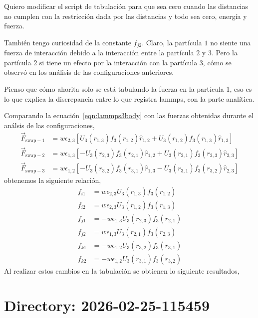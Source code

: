 \documentclass[../main.tex]{subfiles}
\begin{document}
Quiero modificar el script de tabulación para que sea cero cuando las distancias no cumplen con la restricción dada por las distancias y todo sea cero, energía y fuerza.

También tengo curiosidad de la constante $f_{j2}$.
Claro, la partícula \(1\) no siente una fuerza de interacción debido a la interacción entre la partícula \(2\) y \(3\).
Pero la partícula \(2\) si tiene un efecto por la interacción con la partícula \(3\), cómo se observó en los análisis de las configuraciones anteriores.

Pienso que cómo ahorita solo se está tabulando la fuerza en la partícula 1, eso es lo que explica la discrepancia entre lo que registra lammps, con la parte analítica. 

Comparando la ecuación~\eqref{eqn:lammps3body} con las fuerzas obtenidas durante el análsis de las configuraciones, 
\begin{align*}
    \vec{F}_{\mathrm{swap}-1} &= w\epsilon_{2,3}\left[
        U_3(r_{1,3})f_3(r_{1,2})\hat{r}_{1,2} + U_3(r_{1,2})f_3(r_{1,3})\hat{r}_{1,3}
    \right] \\
    \vec{F}_{\mathrm{swap}-2} &= w\epsilon_{1,3}\left[
        -U_3(r_{2,3})f_3(r_{2,1})\hat{r}_{1,2} + U_3(r_{2,1})f_3(r_{2,3})\hat{r}_{2,3}
    \right] \\
    \vec{F}_{\mathrm{swap}-3} &= w\epsilon_{1,2}\left[
            -U_3(r_{3,2})f_3(r_{3,1})\hat{r}_{1,3} - U_3(r_{3,1})f_3(r_{3,2})\hat{r}_{2,3}
    \right]
\end{align*}
obtenemos la siguiente relación,
\begin{align*}
    f_{i1} &= w\epsilon_{2,3}U_3(r_{1,3})f_3(r_{1,2}) \\
    f_{i2} &= w\epsilon_{2,3}U_3(r_{1,2})f_3(r_{1,3}) \\
    f_{j1} &= -w\epsilon_{1,3}U_3(r_{2,3})f_3(r_{2,1}) \\
    f_{j2} &= w\epsilon_{1,3}U_3(r_{2,1})f_3(r_{2,3}) \\
    f_{k1} &= -w\epsilon_{1,2}U_3(r_{3,2})f_3(r_{3,1}) \\
    f_{k2} &= -w\epsilon_{1,2}U_3(r_{3,1})f_3(r_{3,2})
\end{align*}
Al realizar estos cambios en la tabulación se obtienen lo siguiente resultados,
\newpage

\section{Directory: 2026-02-25-115459}
\end{document}
